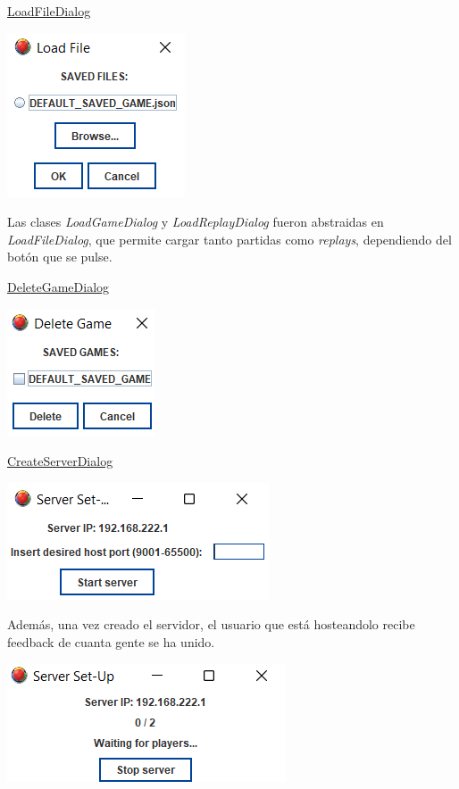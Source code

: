 \documentclass[../DocumentoOficial.tex]{subfiles}
\begin{document}
\begin{sprint}[6]
\underline{LoadFileDialog}
\begin{center}
\includegraphics[scale=1]{load-game-sprint-6.png}
\end{center}

Las clases \textit{LoadGameDialog} y \textit{LoadReplayDialog} fueron abstraidas en \textit{LoadFileDialog}, que permite cargar tanto partidas como \textit{replays}, dependiendo del botón que se pulse.

\underline{DeleteGameDialog}
\begin{center}
\includegraphics[scale=1]{delete-dialog-sprint6.png}
\end{center}

\underline{CreateServerDialog}

\begin{center}
\includegraphics[scale=1]{server-setup-sprint-6.png}
\end{center}

Además, una vez creado el servidor, el usuario que está hosteandolo recibe feedback de cuanta gente se ha unido.

\begin{center}
\includegraphics[scale=1]{server-feedback.png}
\end{center}


\end{sprint}
\end{document}
